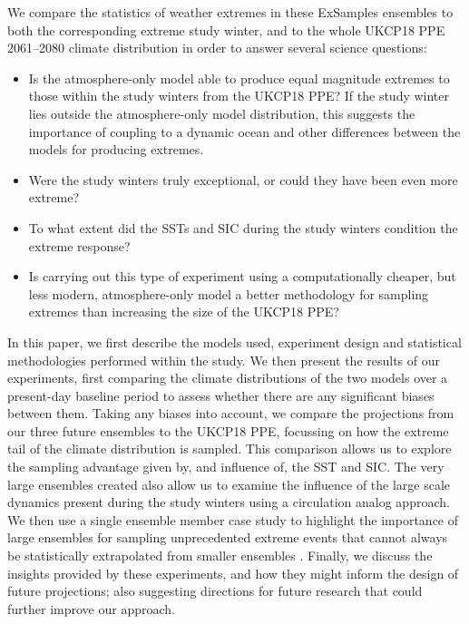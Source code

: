   We compare the statistics of weather extremes in these ExSamples ensembles to both the corresponding extreme study winter, and to the whole UKCP18 PPE 2061--2080 climate distribution in order to answer several science questions:

  \begin{itemize}
    \item Is the atmosphere-only model able to produce equal magnitude extremes to those within the study winters from the UKCP18 PPE? If the study winter lies outside the atmosphere-only model distribution, this suggests the importance of coupling to a dynamic ocean and other differences between the models for producing extremes.
    \item Were the study winters truly exceptional, or could they have been even more extreme? 
    \item To what extent did the SSTs and SIC during the study winters condition the extreme response?
    \item Is carrying out this type of experiment using a computationally cheaper, but less modern, atmosphere-only model a better methodology for sampling extremes than increasing the size of the UKCP18 PPE?
  \end{itemize}

  In this paper, we first describe the models used, experiment design and statistical methodologies performed within the study. We then present the results of our experiments, first comparing the climate distributions of the two models over a present-day baseline period to assess whether there are any significant biases between them. Taking any biases into account, we compare the projections from our three future ensembles to the UKCP18 PPE, focussing on how the extreme tail of the climate distribution is sampled. This comparison allows us to explore the sampling advantage given by, and influence of, the SST and SIC. The very large ensembles created also allow us to examine the influence of the large scale dynamics present during the study winters using a circulation analog approach. We then use a single ensemble member case study to highlight the importance of large ensembles for sampling unprecedented extreme events that cannot always be statistically extrapolated from smaller ensembles \citep{fischer_increasing_2021,gessner_very_2021}. Finally, we discuss the insights provided by these experiments, and how they might inform the design of future projections; also suggesting directions for future research that could further improve our approach.

